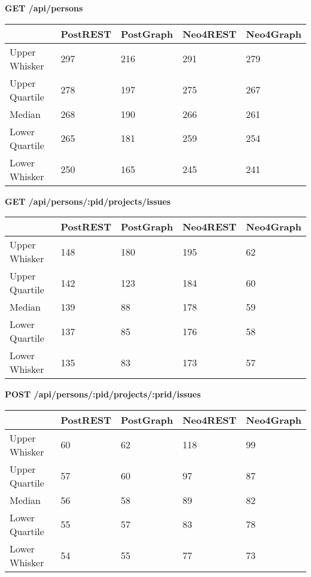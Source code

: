 \noindent
\textbf{GET /api/persons}
\begin{table}[H]
\begin{tabular}{|l|l|l|l|l|}
\hline
               & PostREST & PostGraph & Neo4REST & Neo4Graph \\ \hline
Upper Whisker  & 297      & 216       & 291      & 279       \\ \hline
Upper Quartile & 278      & 197       & 275      & 267       \\ \hline
Median         & 268      & 190       & 266      & 261       \\ \hline
Lower Quartile & 265      & 181       & 259      & 254       \\ \hline
Lower Whisker  & 250      & 165       & 245      & 241       \\ \hline
\end{tabular}
\end{table}
\noindent
\textbf{GET /api/persons/:pid/projects/issues}
\begin{table}[H]
\begin{tabular}{|l|l|l|l|l|}
\hline
               & PostREST & PostGraph & Neo4REST & Neo4Graph \\ \hline
Upper Whisker  & 148      & 180       & 195      & 62        \\ \hline
Upper Quartile & 142      & 123       & 184      & 60        \\ \hline
Median         & 139      & 88        & 178      & 59        \\ \hline
Lower Quartile & 137      & 85        & 176      & 58        \\ \hline
Lower Whisker  & 135      & 83        & 173      & 57        \\ \hline
\end{tabular}
\end{table}
\noindent
\newpage
\textbf{POST /api/persons/:pid/projects/:prid/issues}
\begin{table}[H]
\begin{tabular}{|l|l|l|l|l|}
\hline
               & PostREST & PostGraph & Neo4REST & Neo4Graph \\ \hline
Upper Whisker  & 60       & 62        & 118      & 99        \\ \hline
Upper Quartile & 57       & 60        & 97       & 87        \\ \hline
Median         & 56       & 58        & 89       & 82        \\ \hline
Lower Quartile & 55       & 57        & 83       & 78        \\ \hline
Lower Whisker  & 54       & 55        & 77       & 73        \\ \hline
\end{tabular}
\end{table}
\noindent
